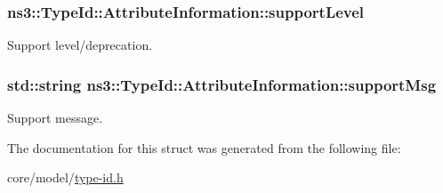 \subsubsection[{\texorpdfstring{support\+Level}{supportLevel}}]{ ns3\+::\+Type\+Id\+::\+Attribute\+Information\+::support\+Level}\hypertarget{structns3_1_1TypeId_1_1AttributeInformation_a16c5c0bf1ebdd7cc6956c2d3a1974f87}{}\label{structns3_1_1TypeId_1_1AttributeInformation_a16c5c0bf1ebdd7cc6956c2d3a1974f87}
Support level/deprecation. 
\subsubsection[{\texorpdfstring{support\+Msg}{supportMsg}}]{\setlength{\rightskip}{0pt plus 5cm}std\+::string ns3\+::\+Type\+Id\+::\+Attribute\+Information\+::support\+Msg}\hypertarget{structns3_1_1TypeId_1_1AttributeInformation_acb7596553a8f62a053b097b99e9a1d4b}{}\label{structns3_1_1TypeId_1_1AttributeInformation_acb7596553a8f62a053b097b99e9a1d4b}
Support message. 

The documentation for this struct was generated from the following file\+:\begin{DoxyCompactItemize}
\item 
core/model/\hyperlink{type-id_8h}{type-\/id.\+h}\end{DoxyCompactItemize}
